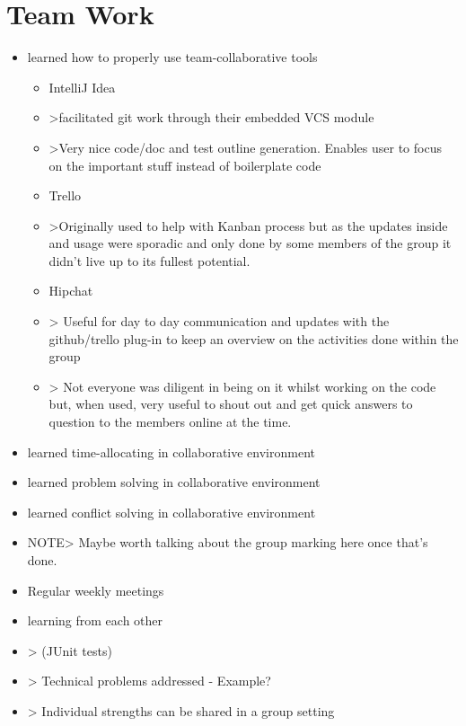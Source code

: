 \section{Team Work}

\begin{itemize}
    \item learned how to properly use team-collaborative tools
    \begin{itemize}
            \item IntelliJ Idea
            \item >facilitated git work through their embedded VCS module
            \item >Very nice code/doc and test outline generation. Enables user to focus on the important stuff instead of boilerplate code
            \item Trello
            \item >Originally used to help with Kanban process but as the updates inside and usage were sporadic and only done by some members of the group it didn't live up to its fullest potential.
            \item Hipchat
            \item > Useful for day to day communication and updates with the github/trello plug-in to keep an overview on the activities done within the group
            \item > Not everyone was diligent in being on it whilst working on the code but, when used, very useful to shout out and get quick answers to question to the members online at the time.
     \end{itemize}

    \item learned time-allocating in collaborative environment
    \item learned  problem solving in collaborative environment
    \item learned  conflict solving in collaborative environment
    \item NOTE> Maybe worth talking about the group marking here once that's done.
    \item Regular weekly meetings
    \item learning from each other
    \item > (JUnit tests)
    \item > Technical problems addressed - Example?
    \item > Individual strengths can be shared in a group setting
\end {itemize}

